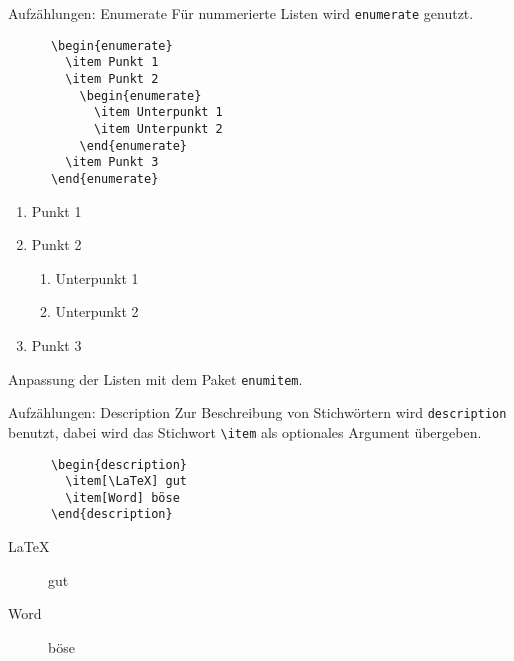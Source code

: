 \begin{frame}[fragile]{Aufzählungen: Enumerate}
  Für nummerierte Listen wird \texttt{enumerate} genutzt.
  \begin{CodeExample}{0.48}
    \begin{lstlisting}
      \begin{enumerate}
        \item Punkt 1
        \item Punkt 2
          \begin{enumerate}
            \item Unterpunkt 1
            \item Unterpunkt 2
          \end{enumerate}
        \item Punkt 3
      \end{enumerate}
    \end{lstlisting}
  \CodeResult
    \begin{enumerate}
      \item Punkt 1
      \item Punkt 2
        \begin{enumerate}
          \item Unterpunkt 1
          \item Unterpunkt 2
        \end{enumerate}
      \item Punkt 3
    \end{enumerate}
  \end{CodeExample}

  \vspace{1em}
  Anpassung der Listen mit dem Paket \texttt{enumitem}.
\end{frame}

\begin{frame}[fragile]{Aufzählungen: Description}
  Zur Beschreibung von Stichwörtern wird \texttt{description} benutzt, dabei wird das
Stichwort \lstinline+\item+ als optionales Argument übergeben.
  \begin{CodeExample}{0.48}
    \begin{lstlisting}
      \begin{description}
        \item[\LaTeX] gut
        \item[Word] böse
      \end{description}
    \end{lstlisting}
  \CodeResult
    \begin{description}
      \item[\LaTeX] gut
      \item[Word] böse
    \end{description}
  \end{CodeExample}
\end{frame}
